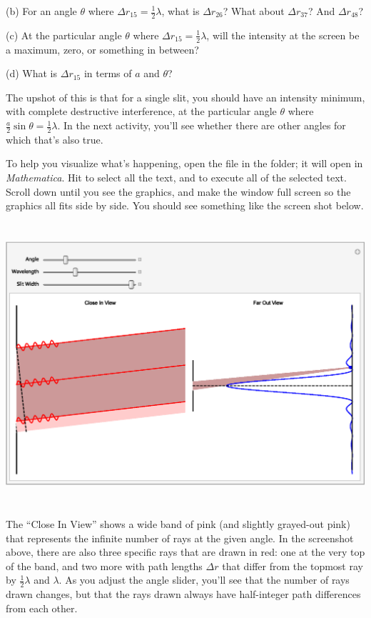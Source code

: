 (b) For an angle $\theta$ where $\Delta r_{15}=\frac{1}{2}\lambda$, what is $\Delta r_{26}$?  What about $\Delta r_{37}$? And $\Delta r_{48}$?
\answerspace{0.5in}

(c) At the particular angle $\theta$ where $\Delta r_{15}=\frac{1}{2}\lambda$, will the intensity at the screen be a maximum, zero, or something in between?
\answerspace{0.4in}

(d) What is $\Delta r_{15}$ in terms of $a$ and $\theta$?
\answerspace{0.4in}

The upshot of this is that for a single slit, you should have an intensity minimum, with complete destructive interference, at the particular angle $\theta$ where $\frac{a}{2} \sin \theta = \frac{1}{2}\lambda$.  In the next activity, you'll see whether there are other angles for which that's also true.

\pagebreak[3]
To help you visualize what's happening, open the file  in the \filename{\coursefolder} folder; 
it will open in \textit{Mathematica}.  Hit  to select all the text, and  
to execute all of the selected text.  Scroll down until you see the graphics, and make the window full screen so the graphics all fits side by side.  You should see something like the screen shot below.

{\centering \includegraphics[height=4.1in]{diffraction_of_light/one_slit_screengrab.eps} \par}

The ``Close In View'' shows a wide band of pink (and slightly grayed-out pink) that represents the infinite number of rays at the given angle.  In the screenshot above, there are also three specific rays that are drawn in red: one at the very top of the band, and two more with path lengths $\Delta r$ that differ from the topmost ray by $\frac{1}{2} \lambda$ and $\lambda$.  As you adjust the angle slider, you'll see that the number of rays drawn changes, but that the rays drawn always have half-integer path differences from each other. 

